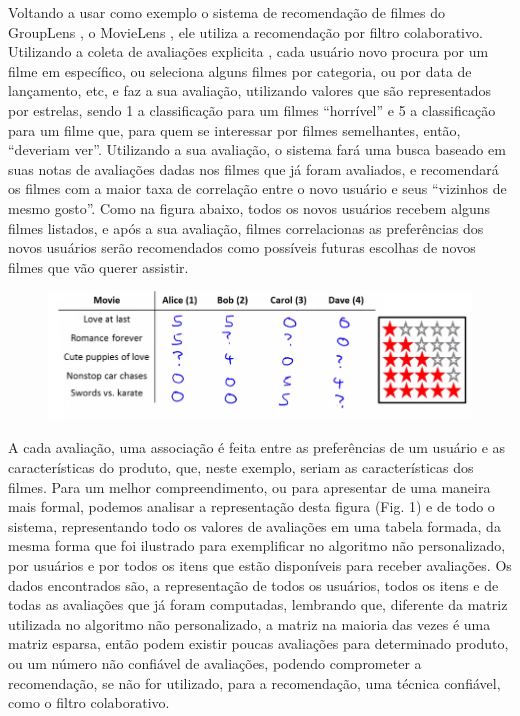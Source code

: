 \documentclass[12pt,
				openright,
				twoside,
				a4paper,
				apter=TITLE,
				section=TITLE,
				subsection=TITLE,
				chapter=TITLE,
				english,
				brazil]{abntex2}
\begin{document}
Voltando a usar como exemplo o sistema de recomendação de filmes do GroupLens \cite{resnick1994grouplen} \cite{konstan1997grouplens}, o MovieLens \cite{miller2003movielens}, ele utiliza a recomendação por filtro colaborativo. Utilizando a coleta de avaliações explicita \cite{melville2010recommender}, cada usuário novo procura por um filme em específico, ou seleciona alguns filmes por categoria, ou por data de lançamento, etc, e faz a sua avaliação, utilizando valores que são representados por estrelas, sendo 1 a classificação para um filmes ``horrível'' e 5 a classificação para um filme que, para quem se interessar por filmes semelhantes, então, ``deveriam ver''. Utilizando a sua avaliação, o sistema fará uma busca baseado em suas notas de avaliações dadas nos filmes que já foram avaliados, e recomendará os filmes com a maior taxa de correlação entre o novo usuário e seus ``vizinhos de mesmo gosto''. Como na figura abaixo, todos os novos usuários recebem alguns filmes listados, e após a sua avaliação, filmes correlacionas as preferências dos novos usuários serão recomendados como possíveis futuras escolhas de novos filmes que vão querer assistir.

\begin{figure}
\centering
\includegraphics[scale=0.4]{img/rate}
\end{figure}

A cada avaliação, uma associação é feita entre as preferências de um usuário e as características do produto, que, neste exemplo, seriam as características dos filmes. Para um melhor compreendimento, ou para apresentar de uma maneira mais formal, podemos analisar a representação desta figura (Fig. 1) e de todo o sistema, representando todo os valores de avaliações em uma tabela formada, da mesma forma que foi ilustrado para exemplificar no algoritmo não personalizado, por usuários e por todos os itens que estão disponíveis para receber avaliações. Os dados encontrados são, a representação de todos os usuários, todos os itens e de todas as avaliações que já foram computadas, lembrando que, diferente da matriz utilizada no algoritmo não personalizado, a matriz na maioria das vezes é uma matriz esparsa, então podem existir poucas avaliações para determinado produto, ou um número não confiável de avaliações, podendo comprometer a recomendação, se não for utilizado, para a recomendação, uma técnica confiável, como o filtro colaborativo.
\end{document}
